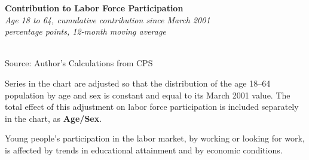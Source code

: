 \documentclass{report}
\makeatletter
\newcommand{\tbllink}[1]{\href{https://raw.githubusercontent.com/bdecon/US-chartbook/master/chartbook/data/#1}{\faTable}}
\newcommand*\short[1]{\expandafter\@gobbletwo\number\numexpr#1\relax}
\newcommand{\absnode}[3]{\node[below right, align=left] at (axis cs: #1,#2) {#3};}
\newcommand{\dateaxisticks}{
		date coordinates in=x, axis line style={draw=none},
		xmax={2022-10-31},
		max space between ticks=40,	    
		xtick={{1990-01-01}, {1992-01-01}, {1994-01-01}, 
			{1996-01-01}, {1998-01-01}, {2000-01-01}, 
			{2002-01-01}, {2004-01-01}, {2006-01-01},
			{2008-01-01}, {2010-01-01}, {2012-01-01}, {2014-01-01},
		    {2016-01-01}, {2018-01-01}, {2020-01-01}, {2022-01-01}, 
		    {2024-01-01}, {2026-01-01}},
		minor xtick={{1989-01-01}, {1991-01-01}, {1993-01-01},
			{1995-01-01}, {1997-01-01}, {1999-01-01}, 
			{2001-01-01}, {2003-01-01}, {2005-01-01}, {2007-01-01},
		    {2009-01-01}, {2011-01-01}, {2013-01-01}, {2015-01-01},
		    {2017-01-01}, {2019-01-01}, {2021-01-01}, {2023-01-01}, 
		    {2025-01-01}, {2027-01-01}},
		enlarge y limits={0.06}, enlarge x limits={0.01},
		}
\newcommand{\bbar}[2]{extra #1 ticks = {{#2}}, extra #1 tick labels = ,
		extra #1 tick style = {grid=major, grid style={thick, black!25}},}
\newcommand{\stdline}[4]{\addplot[very thick, no markers, color=#1] 
		table [x=#2, y=#3, col sep=comma] {#4};	}
\newcommand{\thickline}[4]{\addplot[ultra thick, no markers, color=#1] 
		table [x=#2, y=#3, col sep=comma] {#4};	}
\newcommand{\rebars}{
		\fill[color=black!10] (axis cs:{2007-12-01},\pgfkeysvalueof{/pgfplots/ymin}) rectangle 
			(axis cs:{2009-07-01}, \pgfkeysvalueof{/pgfplots/ymax});
		\fill[color=black!10] (axis cs:{2001-03-01},\pgfkeysvalueof{/pgfplots/ymin}) rectangle 
			(axis cs:{2001-11-01}, \pgfkeysvalueof{/pgfplots/ymax});
		\fill[color=black!10] (axis cs:{2020-02-01},\pgfkeysvalueof{/pgfplots/ymin}) rectangle 
			(axis cs:{2020-05-01}, \pgfkeysvalueof{/pgfplots/ymax});}
\makeatother
\begin{document}
{\begin{minipage}{0.29\textwidth}
\small  
\end{minipage} \hspace{5mm}
\begin{minipage}{0.42\textwidth}
\normalsize \textbf{Contribution to Labor Force Participation}\\
\footnotesize{\textit{Age 18 to 64, cumulative contribution since March 2001}}\\
\footnotesize{\textit{percentage points, 12-month moving average}}\\
\hspace*{-3mm} \\
\footnotesize{Source: Author's Calculations from CPS} \hfill \tbllink{nilf.csv}

\footnotesize Series in the chart are adjusted so that the distribution of the age 18--64 population by age and sex is constant and equal to its March 2001 value. The total effect of this adjustment on labor force participation is included separately in the chart, as \color{violet!80!purple}\textbf{Age/Sex}.
\end{minipage}
\newpage
\begin{minipage}{0.76\textwidth}
\small Young people's participation in the labor market, by working or looking for work, is affected by trends in educational attainment and by economic conditions. 
\vspace{2mm}


\end{minipage}}
\end{document}
